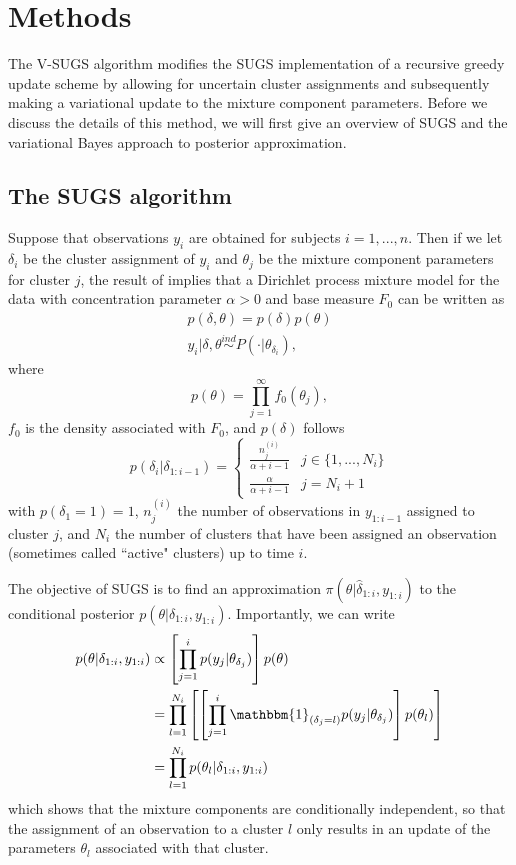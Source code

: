 \documentclass{uwstat572}
\begin{document}
\section{Methods}

The V-SUGS algorithm modifies the SUGS implementation of a recursive greedy update scheme by allowing for uncertain cluster assignments and subsequently making a variational update to the mixture component parameters. Before we discuss the details of this method, we will first give an overview of SUGS and the variational Bayes approach to posterior approximation.

\subsection{The SUGS algorithm}

Suppose that observations $y_i$ are obtained for subjects $i = 1,..., n$. Then if we let $\delta_i$ be the cluster assignment of $y_i$ and $\theta_j$ be the mixture component parameters for cluster $j$, the result of \cite{lo} implies that a Dirichlet process mixture model for the data with concentration parameter $\alpha >  0$ and base measure $F_0$ can be written as 
\begin{align}
p(\delta,\theta) = p(\delta)p(\theta) \nonumber \\
y_i | \delta, \theta \overset{ind}{\sim} P(\cdot | \theta_{\delta_i}), \nonumber
\end{align}
where
$$ p(\theta) = \prod_{j=1}^\infty f_0(\theta_j),$$
$f_0$ is the density associated with $F_0$, and $p(\delta)$ follows 
\[ p(\delta_i | \delta_{1:i-1}) = \begin{cases} 
      \frac{n_j^{(i)}}{\alpha+i-1}& j \in \{1,...,N_i\} \\
      \frac{\alpha}{\alpha+i-1} & j = N_i +1
   \end{cases}
\]
with $p(\delta_1 = 1) = 1$, $n_j^{(i)}$ the number of observations in $y_{1:i-1}$ assigned to cluster $j$, and $N_i$ the number of clusters that have been assigned an observation (sometimes called ``active" clusters) up to time $i$.

The objective of SUGS is to find an approximation $\pi(\theta | \hat{\delta}_{1:i},y_{1:i})$ to the conditional posterior $p(\theta | \delta_{1:i},y_{1:i})$. Importantly, we can write
\begin{align} 
p(\theta | \delta_{1:i},y_{1:i}) &\propto \left[ \prod_{j=1}^i p(y_j | \theta_{\delta_j}) \right] p(\theta) \nonumber \\
&= \prod_{l=1}^{N_i} \left[ \left[ \prod_{j=1}^i \mathbbm{1}_{(\delta_j = l)} p(y_j | \theta_{\delta_j}) \right] p(\theta_l) \right] \nonumber \\
&=  \prod_{l=1}^{N_i} p(\theta_l | \delta_{1:i},y_{1:i}) \nonumber
\end{align}
which shows that the mixture components are conditionally independent, so that the assignment of an observation to a cluster $l$ only results in an update of the parameters $\theta_l$ associated with that cluster. 
\end{document}
